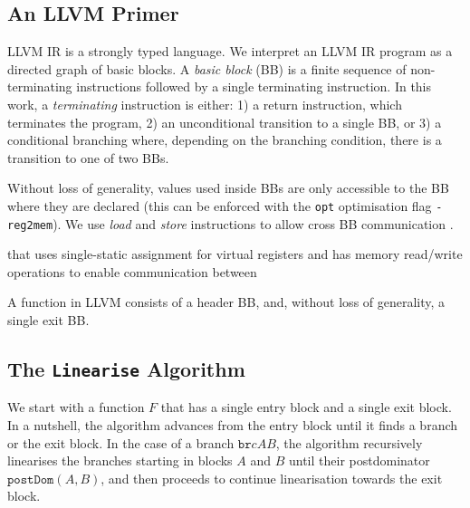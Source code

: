 \subsection{An LLVM Primer}
LLVM IR is a strongly typed language. We interpret an LLVM IR program as a directed graph of {basic blocks}. A \emph{basic block} (BB) is a finite sequence of non-terminating instructions followed by a single terminating instruction. In this work, a \emph{terminating} instruction is either: 1) a return instruction, which terminates the program, 2) an unconditional transition to a single BB, or 3) a conditional branching where, depending on the branching condition, there is a transition to one of two BBs.

Without loss of generality, values used inside BBs are only accessible to the BB where they are declared (this can be enforced with the \texttt{opt} optimisation flag \texttt{-reg2mem}).  We use \emph{load} and \emph{store} instructions to allow cross BB communication .


 that uses single-static assignment for virtual registers and has memory read/write operations to enable communication between 

A function in LLVM consists of a header BB, and, without loss of generality, a single exit BB. 

\subsection{The \texttt{Linearise} Algorithm}
We start with a function $F$ that has a single entry block and a single exit block. In a nutshell, the algorithm advances from the entry block until it finds a branch or the exit block. In the case of a branch  $\texttt{br} c A B$, the algorithm recursively linearises the branches starting in blocks $A$ and $B$ until their postdominator $\texttt{postDom}(A,B)$, and then proceeds to continue linearisation towards the exit block.


